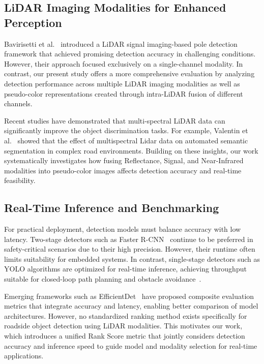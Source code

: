\documentclass[runningheads]{llncs}
\begin{document}
\subsection{LiDAR Imaging Modalities for Enhanced Perception}

Bavirisetti et al.~\cite{bavirisetti2024pole} introduced a LiDAR signal imaging-based pole detection framework that achieved promising detection accuracy in challenging conditions. However, their approach focused exclusively on a single-channel modality. In contrast, our present study offers a more comprehensive evaluation by analyzing detection performance across multiple LiDAR imaging modalities as well as pseudo-color representations created through intra-LiDAR fusion of different channels.

Recent studies have demonstrated that multi-spectral LiDAR data can significantly improve the object discrimination tasks. For example, Valentin et al.~\cite{vierhub2022study} showed that the effect of multispectral Lidar data on automated semantic segmentation in complex road environments. Building on these insights, our work systematically investigates how fusing Reflectance, Signal, and Near-Infrared modalities into pseudo-color images affects detection accuracy and real-time feasibility.

\subsection{Real-Time Inference and Benchmarking}

For practical deployment, detection models must balance accuracy with low latency. Two-stage detectors such as Faster R-CNN~\cite{ren2015faster} continue to be preferred in safety-critical scenarios due to their high precision. However, their runtime often limits suitability for embedded systems. In contrast, single-stage detectors such as YOLO algorithms are optimized for real-time inference, achieving throughput suitable for closed-loop path planning and obstacle avoidance~\cite{wang2023yolov7}.

Emerging frameworks such as EfficientDet~\cite{tan2020efficientdet} have proposed composite evaluation metrics that integrate accuracy and latency, enabling better comparison of model architectures. However, no standardized ranking method exists specifically for roadside object detection using LiDAR modalities. This motivates our work, which introduces a unified Rank Score metric that jointly considers detection accuracy and inference speed to guide model and modality selection for real-time applications.
\end{document}
